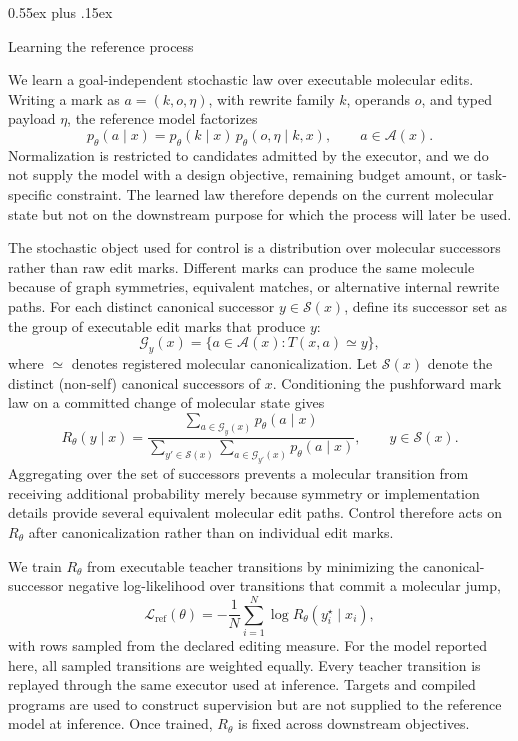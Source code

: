 \documentclass{article}
\makeatletter
\theoremstyle{definition}
\theoremstyle{remark}
\def\subsection{\@startsection{subsection}{2}{\z@}{-1.2ex plus -0.4ex minus -.2ex}%
  {0.55ex plus .15ex}{\normalsize\sc\raggedright}}
\makeatother
\begin{document}
\subsection{Learning the reference process}
\label{sec:gem-reference}

We learn a goal-independent stochastic law over executable molecular edits. Writing a
mark as $a=(k,o,\eta)$, with rewrite family $k$, operands $o$, and typed payload
$\eta$, the reference model factorizes
\begin{equation}
  p_\theta(a\mid x)
  =
  p_\theta(k\mid x)\,
  p_\theta(o,\eta\mid k,x),
  \qquad a\in\mathcal A(x).
  \label{eq:gem-factorization}
\end{equation}
Normalization is restricted to candidates admitted by the executor, and we do not supply the
model with a design objective, remaining budget amount, or task-specific
constraint. The learned law therefore depends on the current molecular state but
not on the downstream purpose for which the process will later be used.

The stochastic object used for control is a distribution over molecular
successors rather than raw edit marks. Different marks can produce the same molecule because of graph symmetries, equivalent matches, or alternative internal rewrite paths. For each distinct canonical successor $y \in \mathcal S(x)$, define its successor set as the group of executable edit marks that produce $y$:
\[
  \mathcal G_y(x)
  =
  \{a\in\mathcal A(x): T(x,a)\simeq y\},
\]
where $\simeq$ denotes registered molecular canonicalization. Let $\mathcal
S(x)$ denote the distinct (non-self) canonical successors of $x$. Conditioning the
pushforward mark law on a committed change of molecular state gives
\begin{equation}
  R_\theta(y\mid x)
  =
  \frac{
    \sum_{a\in\mathcal G_y(x)} p_\theta(a\mid x)
  }{
    \sum_{y'\in\mathcal S(x)}
    \sum_{a\in\mathcal G_{y'}(x)} p_\theta(a\mid x)
  },
  \qquad y\in\mathcal S(x).
  \label{eq:gem-rtheta}
\end{equation}
Aggregating over the set of successors prevents a molecular transition from receiving
additional probability merely because symmetry or implementation details provide
several equivalent molecular edit paths. Control therefore acts on $R_\theta$ after
canonicalization rather than on individual edit marks.

We train $R_\theta$ from executable teacher transitions by minimizing the
canonical-successor negative log-likelihood over transitions that commit a
molecular jump,
\begin{equation}
  \mathcal L_{\mathrm{ref}}(\theta)
  =
  -\frac{1}{N}\sum_{i=1}^{N}\log R_\theta(y_i^\star\mid x_i),
  \label{eq:gem-refloss}
\end{equation}
with rows sampled from the declared editing measure. For the model reported here, all sampled transitions are weighted equally.
Every teacher transition is replayed through the same executor used at
inference. Targets and compiled programs are used to construct supervision but
are not supplied to the reference model at inference. Once trained, $R_\theta$ is
fixed across downstream objectives.
\end{document}
